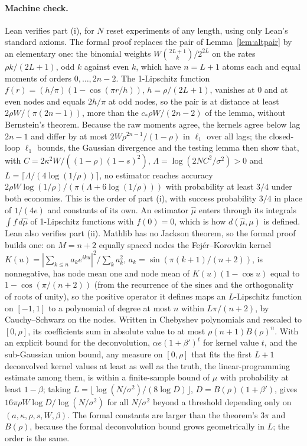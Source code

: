 \documentclass[12pt]{article}
\theoremstyle{definition}
\theoremstyle{remark}
\begin{document}
\paragraph{Machine check.} Lean verifies part (i), for $N$ reset experiments of any length, using only Lean's standard axioms. The formal proof replaces the pair of Lemma~\ref{lem:altpair} by an elementary one: the binomial weights $W\binom{2L+1}{k}/2^{2L}$ on the rates $\rho k/(2L+1)$, odd $k$ against even $k$, which have $n=L+1$ atoms each and equal moments of orders $0,\ldots,2n-2$. The 1-Lipschitz function $f(r)=(h/\pi)(1-\cos(\pi r/h))$, $h=\rho/(2L+1)$, vanishes at $0$ and at even nodes and equals $2h/\pi$ at odd nodes, so the pair is at distance at least $2\rho W/(\pi(2n-1))$, more than the $c_*\rho W/(2n-2)$ of the lemma, without Bernstein's theorem. Because the raw moments agree, the kernels agree below lag $2n-1$ and differ by at most $2W\rho^{2n-1}/(1-\rho)$ in $\ell_1$ over all lags; the closed-loop $\ell_1$ bounds, the Gaussian divergence and the testing lemma then show that, with $C=2\kappa^2W/((1-\rho)(1-s)^2)$, $\Lambda=\log(2NC^2/\sigma^2)>0$ and $L=\lceil\Lambda/(4\log(1/\rho))\rceil$, no estimator reaches accuracy $2\rho W\log(1/\rho)/(\pi(\Lambda+6\log(1/\rho)))$ with probability at least $3/4$ under both economies. This is the order of part (i), with success probability $3/4$ in place of $1/(4e)$ and constants of its own. An estimator $\hat\mu$ enters through its integrals $\int f\,d\hat\mu$ of 1-Lipschitz functions with $f(0)=0$, which is how $d(\hat\mu,\mu)$ is defined. Lean also verifies part (ii). Mathlib has no Jackson theorem, so the formal proof builds one: on $M=n+2$ equally spaced nodes the Fejér--Korovkin kernel $K(u)=|\sum_{k\le n}a_ke^{iku}|^2/\sum_ka_k^2$, $a_k=\sin(\pi(k+1)/(n+2))$, is nonnegative, has node mean one and node mean of $K(u)(1-\cos u)$ equal to $1-\cos(\pi/(n+2))$ (from the recurrence of the sines and the orthogonality of roots of unity), so the positive operator it defines maps an $L$-Lipschitz function on $[-1,1]$ to a polynomial of degree at most $n$ within $L\pi/(n+2)$, by Cauchy--Schwarz on the nodes. Written in Chebyshev polynomials and rescaled to $[0,\rho]$, its coefficients sum in absolute value to at most $\rho(n+1)B(\rho)^n$. With an explicit bound for the deconvolution, $\alpha e(1+\beta')^t$ for kernel value $t$, and the sub-Gaussian union bound, any measure on $[0,\rho]$ that fits the first $L+1$ deconvolved kernel values at least as well as the truth, the linear-programming estimate among them, is within a finite-sample bound of $\mu$ with probability at least $1-\beta$; taking $L=\lfloor\log(N/\sigma^2)/(8\log D)\rfloor$, $D=B(\rho)(1+\beta')$, gives $16\pi\rho W\log D/\log(N/\sigma^2)$ for all $N/\sigma^2$ beyond a threshold depending only on $(a,\kappa,\rho,s,W,\beta)$. The formal constants are larger than the theorem's $3\pi$ and $B(\rho)$, because the formal deconvolution bound grows geometrically in $L$; the order is the same.
\end{document}
